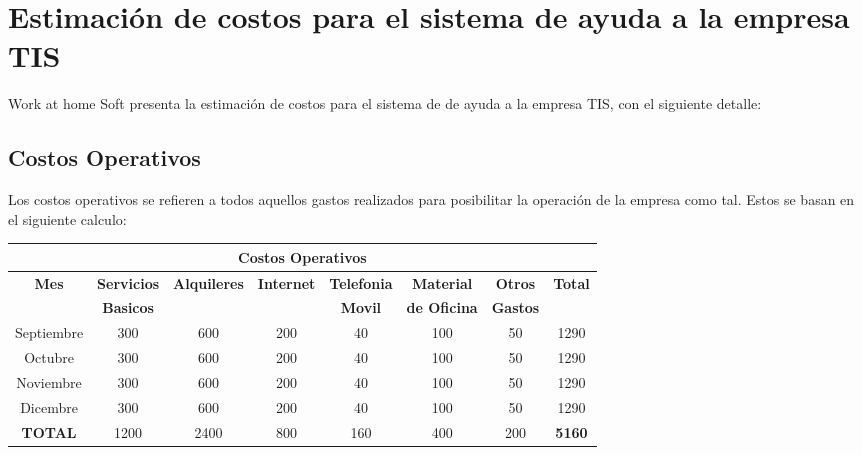 \documentclass[11pt,letterpaper]{report}
\begin{document}
\section{Estimación de costos para el sistema de ayuda a la empresa TIS}
Work at home Soft presenta la estimación de costos para el sistema de de ayuda a la empresa TIS, con el siguiente detalle:
\subsection{Costos Operativos}
Los costos operativos se refieren a todos aquellos gastos realizados para posibilitar la operación de la empresa como tal. Estos se basan en el siguiente calculo: \\
\begin{center}
	\begin{tabular}{|c|c|c|c|c|c|c|c|}
		\hline
		\multicolumn{8}{|c|}{\textbf{Costos Operativos}} \\ \hline
		\textbf{Mes}	& \textbf{Servicios}	& \textbf{Alquileres} & \textbf{Internet} & \textbf{Telefonia} & \textbf{Material}	& \textbf{Otros}	& \textbf{Total} \\
		& \textbf{Basicos} & & & \textbf{Movil} & \textbf{de Oficina} & \textbf{Gastos} & \\ \hline
		Septiembre & 300 & 600	& 200	& 40	& 100	& 50	& 1290 \\ \hline
		Octubre	& 300	& 600	& 200	& 40	& 100	& 50	& 1290 \\ \hline
		Noviembre	& 300	& 600	& 200	& 40	& 100	& 50	& 1290 \\ \hline
		Dicembre	& 300	& 600	& 200	& 40	& 100	& 50	& 1290 \\ \hline
		\textbf{TOTAL}	& 1200	& 2400	& 800	& 160	& 400	& 200	& \textbf{5160} \\ \hline
	\end{tabular}
\end{center}
\end{document}
